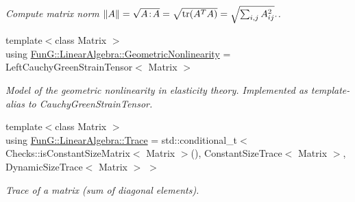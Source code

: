 \begin{DoxyCompactItemize}
\begin{DoxyCompactList}\small\item\em Compute matrix norm $ \|A\| = \sqrt{A\negthinspace : \negthinspace A }= \sqrt{\mathrm{tr}(A^TA)} = \sqrt{\sum_{i,j} A_{ij}^2}. $. \end{DoxyCompactList}\item 
\hypertarget{group__LinearAlgebraGroup_ga7af9b6f793f11a287277a30ea1e32caf}{{\footnotesize template$<$class Matrix $>$ }\\using \hyperlink{group__LinearAlgebraGroup_ga7af9b6f793f11a287277a30ea1e32caf}{Fun\-G\-::\-Linear\-Algebra\-::\-Geometric\-Nonlinearity} = Left\-Cauchy\-Green\-Strain\-Tensor$<$ Matrix $>$}\label{group__LinearAlgebraGroup_ga7af9b6f793f11a287277a30ea1e32caf}

\begin{DoxyCompactList}\small\item\em Model of the geometric nonlinearity in elasticity theory. Implemented as template-\/alias to Cauchy\-Green\-Strain\-Tensor. \end{DoxyCompactList}\item 
\hypertarget{group__LinearAlgebraGroup_ga2647ef776e1808831f80ac12d45f2ce0}{{\footnotesize template$<$class Matrix $>$ }\\using \hyperlink{group__LinearAlgebraGroup_ga2647ef776e1808831f80ac12d45f2ce0}{Fun\-G\-::\-Linear\-Algebra\-::\-Trace} = std\-::conditional\-\_\-t$<$ Checks\-::is\-Constant\-Size\-Matrix$<$ Matrix $>$(), Constant\-Size\-Trace$<$ Matrix $>$, Dynamic\-Size\-Trace$<$ Matrix $>$ $>$}\label{group__LinearAlgebraGroup_ga2647ef776e1808831f80ac12d45f2ce0}

\begin{DoxyCompactList}\small\item\em Trace of a matrix (sum of diagonal elements). \end{DoxyCompactList}\end{DoxyCompactItemize}
